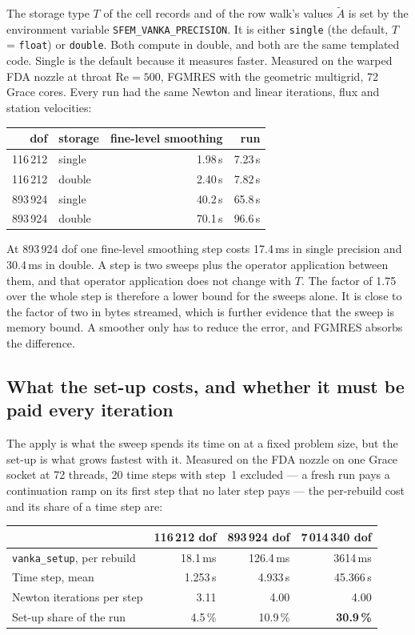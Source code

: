 \documentclass[11pt,a4paper]{article}
\newcommand{\code}[1]{\texttt{\small #1}}
\newcommand{\Rey}{\mathrm{Re}}
\begin{document}
The storage type $T$ of the cell records and of the row walk's values $\tilde A$ is set by
the environment variable \code{SFEM\_VANKA\_PRECISION}. It is either \code{single}
(the default, $T$ = \code{float}) or \code{double}. Both compute in double, and both are the same templated code. Single is the default because it
measures faster. Measured on the warped FDA nozzle at throat $\Rey = 500$, FGMRES with the
geometric multigrid, 72 Grace cores. Every run had the same Newton and linear iterations, flux
and station velocities:
\begin{center}
\begin{tabular}{@{}rlrr@{}}
\toprule
dof & storage & fine-level smoothing & run \\
\midrule
116\,212 & single & 1.98\,s & 7.23\,s \\
116\,212 & double & 2.40\,s & 7.82\,s \\
893\,924 & single & 40.2\,s & 65.8\,s \\
893\,924 & double & 70.1\,s & 96.6\,s \\
\bottomrule
\end{tabular}
\end{center}
At 893\,924 dof one fine-level smoothing step costs 17.4\,ms in single precision and 30.4\,ms
in double. A step is two sweeps plus the operator application between them, and that operator
application does not change with $T$. The factor of 1.75 over the whole step is therefore a
lower bound for the sweeps alone. It is close to the factor of two in bytes streamed, which is
further evidence that the sweep is memory bound. A smoother only has to reduce the error, and FGMRES
absorbs the difference.

\subsection{What the set-up costs, and whether it must be paid every iteration}
\label{sec:setupcost}

The apply is what the sweep spends its time on at a fixed problem size, but the set-up is what
grows fastest with it. Measured on the FDA nozzle on one Grace socket at 72 threads, 20 time
steps with step~1 excluded --- a fresh run pays a continuation ramp on its first step that no
later step pays --- the per-rebuild cost and its share of a time step are:

\begin{center}
\small
\begin{tabular}{@{}lrrr@{}}
\toprule
& 116\,212 dof & 893\,924 dof & 7\,014\,340 dof \\
\midrule
\code{vanka\_setup}, per rebuild & 18.1\,ms & 126.4\,ms & 3614\,ms \\
Time step, mean                  & 1.253\,s & 4.933\,s  & 45.366\,s \\
Newton iterations per step       & 3.11     & 4.00      & 4.00 \\
Set-up share of the run          & 4.5\,\%  & 10.9\,\%  & \textbf{30.9\,\%} \\
\bottomrule
\end{tabular}
\end{center}
\end{document}
